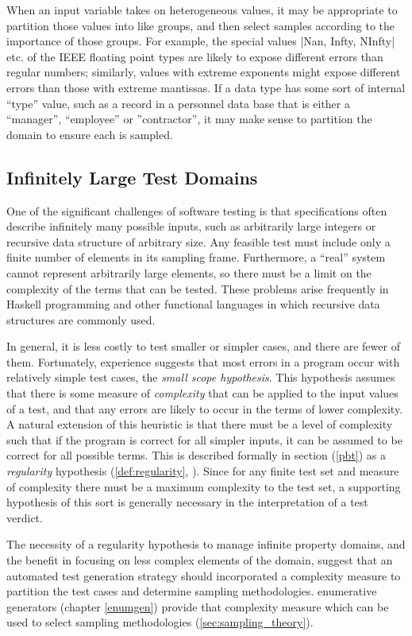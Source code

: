 When an input variable takes on heterogeneous values,
it may be appropriate to partition those values into like groups,
and then select samples according to the importance of those groups.
For example,
the special values |Nan, Infty, NInfty| etc. of the IEEE floating point types
are likely to expose different errors than regular numbers;
similarly, values with extreme exponents might
expose different errors than those with extreme mantissas.
If a data type has some sort of internal ``type'' value,
such as a record in a personnel data base that is either a ``manager'',
``employee'' or ''contractor'',
it may make sense to partition the domain to ensure each is sampled.

\subsection{Infinitely Large Test Domains}
One of the significant challenges of software testing
is that specifications often describe infinitely many possible inputs,
such as arbitrarily large integers or recursive data structure of arbitrary size.
Any feasible test must include only a finite number of elements
in its sampling frame.
Furthermore, a ``real'' system cannot represent arbitrarily large elements,
so there must be a limit on the complexity of the terms that can be tested.
These problems arise frequently in Haskell programming and other functional languages
in which recursive data structures are commonly used.

In general, it is less costly to test smaller or simpler cases,
and there are fewer of them.
Fortunately, experience suggests that
most errors in a program occur with relatively simple test cases,
the \emph{small scope hypothesis}.
This hypothesis assumes that
there is some measure of \emph{complexity}
that can be applied to the input values of a test,
and that any errors are likely to occur in the terms of lower complexity.
A natural extension of this heuristic is that
there must be a level of complexity such that
if the program is correct for all simpler inputs,
it can be assumed to be correct for all possible terms.
This is described formally in section (\ref{pbt})
as a \emph{regularity} hypothesis (\ref{def:regularity}, \cite{BernotGaudelMarre1991}).
Since for any finite test set and measure of complexity
there must be a maximum complexity to the test set,
a supporting hypothesis of this sort is generally necessary
in the interpretation of a test verdict.

The necessity of a regularity hypothesis to manage infinite property domains,
and the benefit in focusing on less complex elements of the domain,
suggest that an automated test generation strategy should incorporated a complexity measure
to partition the test cases and determine sampling methodologies.
\GC enumerative generators (chapter \ref{enumgen}) provide that complexity measure
which can be used to select sampling methodologies (\ref{sec:sampling_theory}).